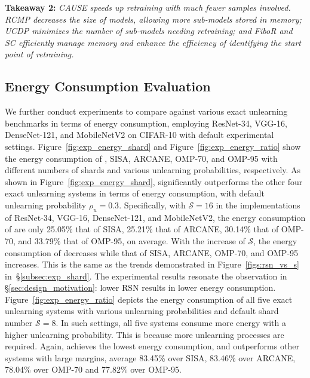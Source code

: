 \documentclass[conference,compsoc]{IEEEtran}
\begin{document}
\begin{formal}
\textbf{Takeaway 2: }\textit{CAUSE speeds up retraining with much fewer samples involved. RCMP decreases the size of models, allowing more sub-models stored in memory; UCDP minimizes the number of sub-models needing retraining; and FiboR and SC efficiently manage memory and enhance the efficiency of identifying the start point of retraining.}
\end{formal}

\subsection{Energy Consumption Evaluation}
\label{subsec:exp_energy}

We further conduct experiments to compare \tool against various exact unlearning benchmarks in terms of energy consumption, employing ResNet-34, VGG-16, DenseNet-121, and MobileNetV2 on CIFAR-10 with default experimental settings. Figure~\ref{fig:exp_energy_shard} and Figure~\ref{fig:exp_energy_ratio} show the energy consumption of \tool, SISA, ARCANE, OMP-70, and OMP-95 with different numbers of shards and various unlearning probabilities, respectively. As shown in Figure~\ref{fig:exp_energy_shard}, \tool significantly outperforms the other four exact unlearning systems in terms of energy consumption, with default unlearning probability $\rho_u=0.3$. Specifically, with $\mathcal{S}=16$ in the implementations of ResNet-34, VGG-16, DenseNet-121, and MobileNetV2, the energy consumption of \tool are only 25.05\% that of SISA, 25.21\% that of ARCANE, 30.14\% that of OMP-70, and 33.79\% that of OMP-95, on average. With the increase of $\mathcal{S}$, the energy consumption of \tool decreases while that of SISA, ARCANE, OMP-70, and OMP-95 increases. This is the same as the trends demonstrated in Figure~\ref{figs:rsn_vs_s} in~\S\ref{subsec:exp_shard}.
The experimental results resonate the observation in \S\ref{sec:design_motivation}: lower RSN results in lower energy consumption.
Figure~\ref{fig:exp_energy_ratio} depicts the energy consumption of all five exact unlearning systems with various unlearning probabilities and default shard number $\mathcal{S}=8$. In such settings, all five systems consume more energy with a higher unlearning probability. This is because more unlearning processes are required. Again, \tool achieves the lowest energy consumption, and outperforms other systems with large margins, \ie average 83.45\% over SISA, 83.46\% over ARCANE, 78.04\% over OMP-70 and 77.82\% over OMP-95.
\end{document}
